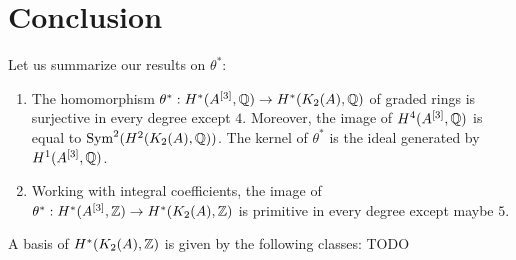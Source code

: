 \section{Conclusion}
Let us summarize our results on $\theta^*$:
\begin{theorem}\label{thetaTheorem}
\begin{enumerate}
\item The homomorphism $\theta^* : H^*(A\hilb{3},\Q)\rightarrow H^*(\kum{A}{2},\Q)$ of graded rings is surjective in every degree except $4$. Moreover, the image of $H^4(A\hilb{3},\Q)$ is equal to $\Sym^2(H^2(\kum{A}{2},\Q))$. 
The kernel of $\theta^*$ is the ideal generated by $H^1(A\hilb{3},\Q)$.
\item Working with integral coefficients, the image of $\theta^* : H^*(A\hilb{3},\Z)\rightarrow H^*(\kum{A}{2},\Z)$ is primitive in every degree except maybe $5$.
\end{enumerate}
\end{theorem}

\begin{theorem}
A basis of $H^*(\kum{A}{2},\Z)$ is given by the following classes:
TODO
\end{theorem}
